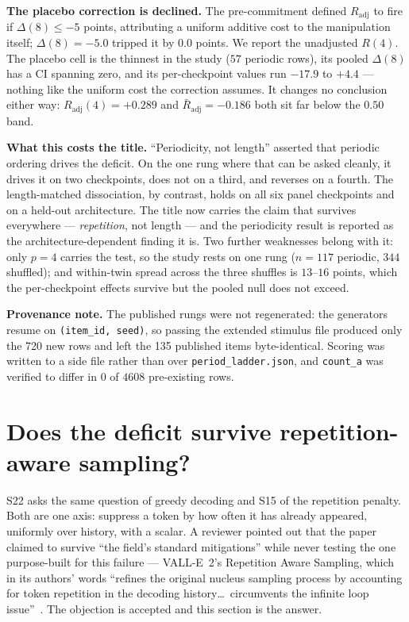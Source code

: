 \documentclass[11pt]{article}
\begin{document}
\textbf{The placebo correction is declined.} The pre-commitment defined
$R_{\text{adj}}$ to fire if $\Delta(8) \le -5$ points, attributing a uniform
additive cost to the manipulation itself; $\Delta(8) = -5.0$ tripped it by
$0.0$ points. We report the unadjusted $R(4)$. The placebo cell is the thinnest
in the study ($57$ periodic rows), its pooled $\Delta(8)$ has a CI spanning zero,
and its per-checkpoint values run $-17.9$ to $+4.4$ --- nothing like the uniform
cost the correction assumes. It changes no conclusion either way:
$R_{\text{adj}}(4) = +0.289$ and $\bar R_{\text{adj}} = -0.186$ both sit far
below the $0.50$ band.

\textbf{What this costs the title.} ``Periodicity, not length'' asserted that
periodic ordering drives the deficit. On the one rung where that can be asked
cleanly, it drives it on two checkpoints, does not on a third, and reverses on a
fourth. The length-matched dissociation, by contrast, holds on all six panel
checkpoints and on a held-out architecture. The title now carries the claim that
survives everywhere --- \emph{repetition}, not length --- and the periodicity
result is reported as the architecture-dependent finding it is. Two further
weaknesses belong with it: only $p{=}4$ carries the test, so the study rests on
one rung ($n{=}117$ periodic, $344$ shuffled); and within-twin spread across the
three shuffles is $13$--$16$ points, which the per-checkpoint effects survive but
the pooled null does not exceed.

\textbf{Provenance note.} The published rungs were not regenerated: the
generators resume on \texttt{(item\_id, seed)}, so passing the extended stimulus
file produced only the 720 new rows and left the 135 published items
byte-identical. Scoring was written to a side file rather than over
\texttt{period\_ladder.json}, and \texttt{count\_a} was verified to differ in
$0$ of $4608$ pre-existing rows.

\section{Does the deficit survive repetition-aware sampling?}
\label{sec:s29}

S22 asks the same question of greedy decoding and S15 of the repetition penalty.
Both are one axis: suppress a token by how often it has already appeared,
uniformly over history, with a scalar. A reviewer pointed out that the paper
claimed to survive ``the field's standard mitigations'' while never testing the
one purpose-built for this failure --- VALL-E~2's Repetition Aware Sampling,
which in its authors' words ``refines the original nucleus sampling process by
accounting for token repetition in the decoding history\ldots\ circumvents the
infinite loop issue''~\cite{chen2024valle2}. The objection is accepted and this
section is the answer.
\end{document}
